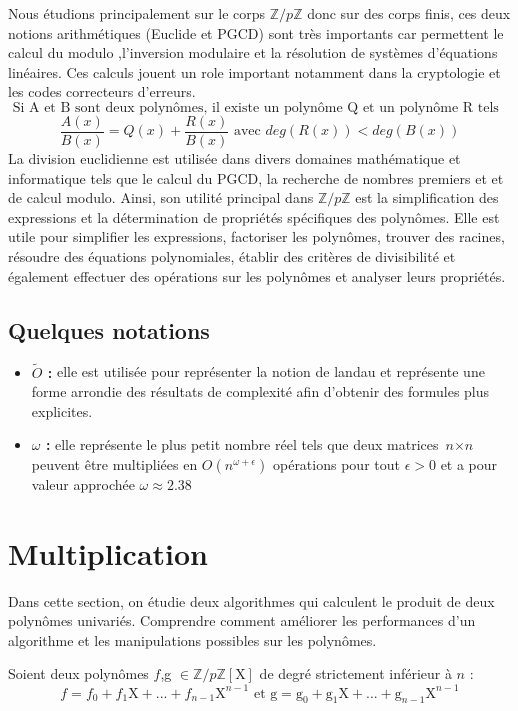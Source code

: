 \documentclass[a4paper]{article}
\begin{document}
Nous étudions principalement sur le corps ${\mathbb{Z}/p \mathbb{Z}}$ donc sur des corps finis, ces deux notions arithmétiques (Euclide et PGCD) sont très importants car permettent le calcul du modulo ,l'inversion modulaire et la résolution de systèmes d'équations linéaires. Ces calculs jouent un role important notamment dans la cryptologie et les codes correcteurs d'erreurs.
\[
\text{ Si A et B sont deux polynômes, il existe un polynôme Q et un polynôme R tels que }\] 
 \[ \dfrac{A(x)}{B(x)} = Q(x)+\dfrac{R(x)}{B(x)} \text{ avec } deg(R(x)) < deg(B(x))
\]
La division euclidienne est utilisée dans divers domaines mathématique et informatique tels que le calcul du PGCD, la recherche de nombres premiers et et de calcul modulo. Ainsi, son utilité principal dans ${\mathbb{Z}/p \mathbb{Z}}$ est la simplification des expressions et la détermination de propriétés spécifiques des polynômes. Elle est utile pour simplifier les expressions, factoriser les polynômes, trouver des racines, résoudre des équations polynomiales, établir des critères de divisibilité et également effectuer des opérations sur les polynômes et analyser leurs propriétés.

 \subsection{Quelques notations}
 \begin{itemize}
 \item \textbf{$\tilde{O}$ :} elle est utilisée pour représenter la notion de landau et représente une forme arrondie des résultats de complexité afin d'obtenir des formules plus explicites.
 \item \textbf{$\omega$ :} elle représente le plus petit nombre réel tels que deux matrices $\textit{n}\times\textit{n}$ peuvent être multipliées en $O(\textit{n}^{\omega+\epsilon})$ opérations pour tout $\epsilon>0$ et a pour valeur approchée $\omega\approx2.38$

 
 \end{itemize}


\section{Multiplication}

Dans cette section, on étudie deux algorithmes qui calculent le produit de deux polynômes univariés.
Comprendre comment améliorer les performances d'un algorithme et les manipulations possibles sur les polynômes.


Soient deux polynômes $f$,g $\in \mathbb{Z}/p\mathbb{Z}[\mathrm{X}]$ de degré strictement inférieur à $n$ :
\[
f=f_0+f_1\mathrm{X}+...+f_{n-1}\mathrm{X}^{n-1}\text{ et g}=\mathrm{g}_0+\mathrm{g}_1\mathrm{X}+...+\mathrm{g}_{n-1}\mathrm{X}^{n-1}
\]
\end{document}
